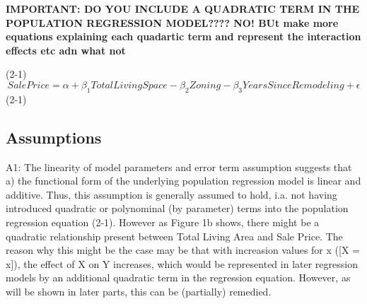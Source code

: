 \documentclass[a4paper]{article}
\begin{document}
\begin{center}
\end{center}




\textbf{IMPORTANT: DO YOU INCLUDE A QUADRATIC TERM IN THE POPULATION REGRESSION MODEL???? NO! BUt make more equations explaining each quadartic term and represent the interaction effects etc adn what not }

(2-1)$$ {SalePrice} = \alpha + \beta_{1} TotalLivingSpace - \beta_{2}  Zoning - \beta_{3}  YearsSinceRemodeling +\epsilon$$ (2-1)



\subsection{Assumptions}


\indent A1: The linearity of model parameters and error term assumption suggests that a) the functional form of the underlying population regression model is linear and additive. Thus, this assumption is generally assumed to hold, i.a. not having introduced quadratic or polynominal (by parameter) terms into the population regression equation (2-1). However as Figure 1b shows, there might be a quadratic relationship present between Total Living Area and Sale Price. The reason why this might be the case may be that with increasion values for x ([X = x]), the effect of X on Y increases, which would be represented in later regression models by an additional quadratic term in the regression equation. However, as will be shown in later parts, this can be (partially) remedied.
\end{document}
